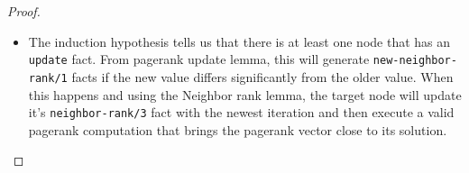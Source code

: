 \documentclass[9pt]{article}
\begin{document}
\begin{proof}
\begin{itemize}
   \item The induction hypothesis tells us that there is at least one node that
   has an \texttt{update} fact. From pagerank update lemma, this
   will generate \texttt{new-neighbor-rank/1} facts if the new value differs
   significantly from the older value. When this happens and using the Neighbor
   rank lemma, the target node will update it's \texttt{neighbor-rank/3} fact
   with the newest iteration and then execute a valid pagerank computation that
   brings the pagerank vector close to its solution.

\end{itemize}

\end{proof}



\end{document}
